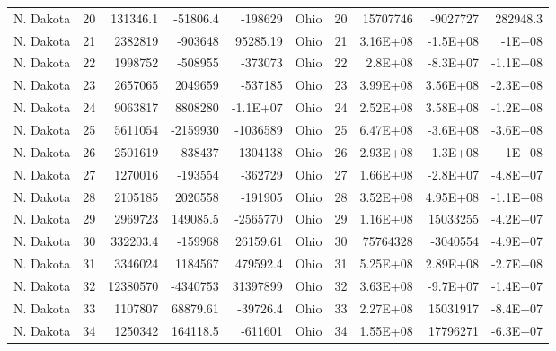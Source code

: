 \begin{landscape}
\begin{singlespace}
\begin{longtable}{lrrrr|lrrrr}
		N. Dakota &  20 & 131346.1 & -51806.4 & -198629 & Ohio &  20 & 15707746 & -9027727 & 282948.3 \\
		N. Dakota &  21 & 2382819 & -903648 & 95285.19 & Ohio &  21 & 3.16E+08 & -1.5E+08 & -1E+08 \\
		N. Dakota &  22 & 1998752 & -508955 & -373073 & Ohio &  22 & 2.8E+08 & -8.3E+07 & -1.1E+08 \\
		N. Dakota &  23 & 2657065 & 2049659 & -537185 & Ohio &  23 & 3.99E+08 & 3.56E+08 & -2.3E+08 \\
		N. Dakota &  24 & 9063817 & 8808280 & -1.1E+07 & Ohio &  24 & 2.52E+08 & 3.58E+08 & -1.2E+08 \\
		N. Dakota &  25 & 5611054 & -2159930 & -1036589 & Ohio &  25 & 6.47E+08 & -3.6E+08 & -3.6E+08 \\
		N. Dakota &  26 & 2501619 & -838437 & -1304138 & Ohio &  26 & 2.93E+08 & -1.3E+08 & -1E+08 \\
		N. Dakota &  27 & 1270016 & -193554 & -362729 & Ohio &  27 & 1.66E+08 & -2.8E+07 & -4.8E+07 \\
		N. Dakota &  28 & 2105185 & 2020558 & -191905 & Ohio &  28 & 3.52E+08 & 4.95E+08 & -1.1E+08 \\
		N. Dakota &  29 & 2969723 & 149085.5 & -2565770 & Ohio &  29 & 1.16E+08 & 15033255 & -4.2E+07 \\
		N. Dakota &  30 & 332203.4 & -159968 & 26159.61 & Ohio &  30 & 75764328 & -3040554 & -4.9E+07 \\
		N. Dakota &  31 & 3346024 & 1184567 & 479592.4 & Ohio &  31 & 5.25E+08 & 2.89E+08 & -2.7E+08 \\
		N. Dakota &  32 & 12380570 & -4340753 & 31397899 & Ohio &  32 & 3.63E+08 & -9.7E+07 & -1.4E+07 \\
		N. Dakota &  33 & 1107807 & 68879.61 & -39726.4 & Ohio &  33 & 2.27E+08 & 15031917 & -8.4E+07 \\
		N. Dakota &  34 & 1250342 & 164118.5 & -611601 & Ohio &  34 & 1.55E+08 & 17796271 & -6.3E+07\\


\end{longtable}
\end{singlespace}
\end{landscape}
